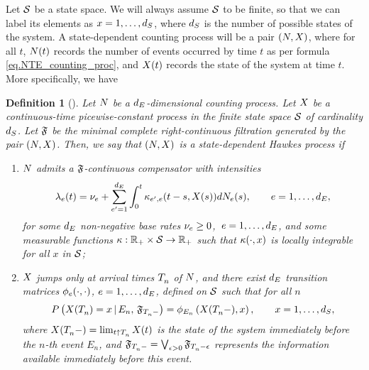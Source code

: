 \documentclass[10pt]{article}
\newtheorem{defi}[thm]{Definition}
\begin{document}
Let $\stateSpace$ be a state space. We will always assume $\stateSpace$ to be finite, so that we can label its elements as $x=1, \dots, \numStates$, where $\numStates$ is the number of possible states of the system. A state-dependent counting process will be a pair $(\multiCountingProc, \stateVariable)$, where for all $t$, $\multiCountingProc(t)$ records the number of events occurred by time $t$ as per formula \eqref{eq.NTE_counting_proc}, and $\stateVariable(t)$ records the state of the system at time $t$. More specifically, we have
\begin{defi}[{\cite[Definition 2.1]{MP18sta}}]\label{def.sdHawkes}
 Let $\multiCountingProc$ be a $\numEventTypes$-dimensional counting process. Let $\stateVariable$ be a continuous-time picewise-constant process in the finite state space $\stateSpace$ of cardinality $\numStates$. Let $\filtrationF$ be the minimal complete right-continuous filtration generated by the pair $(\multiCountingProc, \stateVariable)$. Then, we say that $(\multiCountingProc, \stateVariable)$ is a state-dependent Hawkes process if 
 \begin{enumerate}
  \item $\multiCountingProc$ admits a $\filtrationF$-continuous compensator with intensities
  \begin{equation}\label{eq.intensity_of_sdHawkes}
   \intensity(t) = \baseRate_e + \sum_{\eone=1}^{\numEventTypes}\intzerot \hawkesKernel\subscriptee(t-s, \stateVariable(s))d\countingProc(s), \qquad e=1,\dots,\numEventTypes,
  \end{equation}
  for some $\numEventTypes$ non-negative base rates $\baseRate_e\geq 0$, $\, e=1, \dots, \numEventTypes$, and some measurable functions $\hawkesKernel: \R_+ \times \stateSpace \rightarrow \R_+$ such that $\hawkesKernel(\cdot, x)$ is locally integrable for all $x$ in $\stateSpace$;
  \item $\stateVariable$ jumps only at arrival times $\arrivalTimes[ ]_{n}$ of $\multiCountingProc$, and there exist $\numEventTypes$ transition matrices $\transProb_e(\cdot,\cdot)$, $e=1,\dots, \numEventTypes$, defined on $\stateSpace$ such that for all $n$
  \begin{equation}
   \Prob\left( \stateVariable(\arrivalTimes[ ]_{n})=x \,  \vert \,  E_n, \, \filtrationF_{\arrivalTimes[ ]_{n}-} \right)
   =
   \transProb_{E_n}\left(\stateVariable(\arrivalTimes[ ]_{n}-),x\right),
   \qquad
   x=1, \dots, \numStates,
  \end{equation}
  where $\stateVariable(\arrivalTimes[ ]_{n}- ) = \lim_{t\uparrow \arrivalTimes[ ]_{n}} \stateVariable(t)$ is the state of the system immediately before the $n$-th event $E_n$, and $\filtrationF_{\arrivalTimes[ ]_{n}-} = \bigvee_{\epsilon>0} \filtrationF_{\arrivalTimes[ ]_{n} - \epsilon}$ represents the information available immediately before this event.
 \end{enumerate}
\end{defi}
\end{document}
